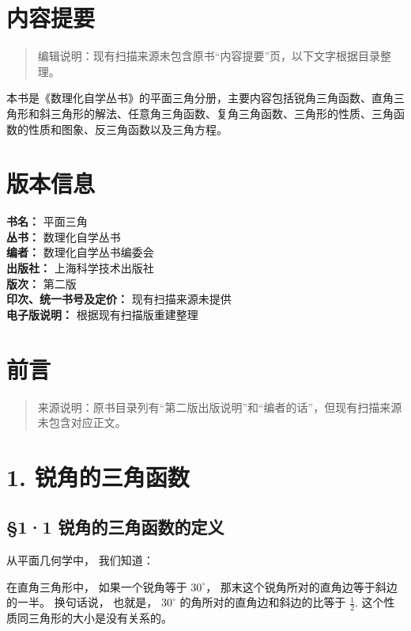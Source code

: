\chapter*{内容提要}

\begin{quote}
编辑说明：现有扫描来源未包含原书``内容提要''页，以下文字根据目录整理。
\end{quote}

本书是《数理化自学丛书》的平面三角分册，主要内容包括锐角三角函数、直角三角形和斜三角形的解法、任意角三角函数、复角三角函数、三角形的性质、三角函数的性质和图象、反三角函数以及三角方程。

\chapter*{版本信息}

\begin{flushleft}
\textbf{书名：} 平面三角\\
\textbf{丛书：} 数理化自学丛书\\
\textbf{编者：} 数理化自学丛书编委会\\
\textbf{出版社：} 上海科学技术出版社\\
\textbf{版次：} 第二版\\
\textbf{印次、统一书号及定价：} 现有扫描来源未提供\\
\textbf{电子版说明：} 根据现有扫描版重建整理
\end{flushleft}

\chapter{前言}

\begin{quote}
来源说明：原书目录列有``第二版出版说明''和``编者的话''，但现有扫描来源未包含对应正文。
\end{quote}

\chapter{1. 锐角的三角函数}

\section{§1·1 锐角的三角函数的定义}

从平面几何学中， 我们知道：

在直角三角形中， 如果一个锐角等于 \(30^{\circ}\)，
那末这个锐角所对的直角边等于斜边的一半。 换句话说， 也就是，
\(30^{\circ}\) 的角所对的直角边和斜边的比等于 \(\frac{1}{2}\).
这个性质同三角形的大小是没有关系的。

